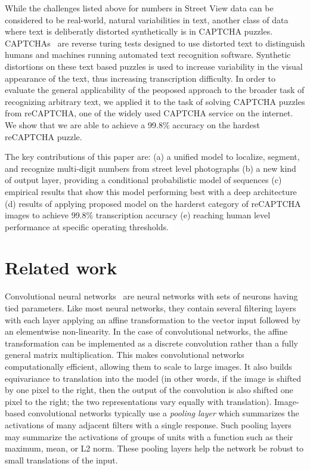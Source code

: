 \documentclass{article} \usepackage{comment}
\begin{document}
While the challenges listed above for numbers in Street View data can be considered to be real-world, natural variabilities in text, another class of data where text is deliberatly distorted synthetically is in CAPTCHA puzzles. CAPTCHAs~\cite{} are reverse turing tests designed to use distorted text to distinguish humans and machines running automated text recognition software. Synthetic distortions on these text based puzzles is used to increase variability in the visual appearance of the text, thus increasing transcription difficulty. In order to evaluate the general applicability of the peoposed approach to the broader task of recognizing arbitrary text, we applied it to the task of solving CAPTCHA puzzles from reCAPTCHA, one of the widely used CAPTCHA service on the internet. We show that we are able to achieve a 99.8\% accuracy on the hardest reCAPTCHA puzzle. 

The key contributions of this paper are:
(a) a unified model to localize, segment, and recognize multi-digit numbers from street level photographs
(b) a new kind of output layer, providing a conditional probabilistic model of sequences
(c) empirical results that show this model performing best with a deep architecture
(d) results of applying proposed model on the harderst category of reCAPTCHA images to achieve 99.8\% transcription accuracy
(e) reaching human level performance at specific operating thresholds.




\section{Related work}
\label{sec:related}

Convolutional neural networks~\citep{Fukushima80,LeCun98-small} are neural networks with sets of neurons
having tied parameters.
Like most neural networks, they contain several filtering layers with each layer applying
an affine transformation to the vector input followed by an elementwise non-linearity.
In the case of convolutional networks, the affine transformation can be implemented as a
discrete convolution rather than a fully general matrix multiplication. This makes convolutional
networks computationally efficient, allowing them to scale to large images.
It also builds equivariance to translation into the model
(in other words, if the image is shifted by one pixel to the right, then the output of the
convolution is also shifted one pixel to the right; the two representations vary equally with translation).
Image-based convolutional networks typically use a {\em pooling layer} which summarizes 
the activations of many adjacent filters with a single response. Such pooling layers may summarize
the activations of groups of units with a function such as their maximum, mean, or L2 norm.
These pooling layers help the network be robust to small translations of the input.
\end{document}
